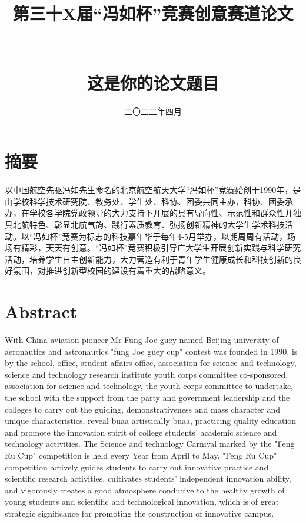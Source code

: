 \documentclass[lang=cn,12pt]{frbpaper}
\title{第三十X届“冯如杯”竞赛创意赛道论文\\ \quad \\ \quad \\这是你的论文题目}
\date{二〇二二年四月}
\begin{document}
\maketitle


\makeabstract

\section*{摘要}
以中国航空先驱冯如先生命名的北京航空航天大学“冯如杯”竞赛始创于1990年，是由学校科学技术研究院、教务处、学生处、科协、团委共同主办，科协、团委承办，在学校各学院党政领导的大力支持下开展的具有导向性、示范性和群众性并独具北航特色、彰显北航气韵、践行素质教育、弘扬创新精神的大学生学术科技活动。以“冯如杯”竞赛为标志的科技嘉年华于每年4-5月举办，以期周周有活动，场场有精彩，天天有创意。“冯如杯”竞赛积极引导广大学生开展创新实践与科学研究活动，培养学生自主创新能力，大力营造有利于青年学生健康成长和科技创新的良好氛围，对推进创新型校园的建设有着重大的战略意义。

\clearpage


\section*{Abstract}
With China aviation pioneer Mr Fung Joe guey named Beijing university of aeronautics and astronautics "fung Joe guey cup" contest was founded in 1990, is by the school, office, student affairs office, association for science and technology, science and technology research institute youth corps committee co-sponsored, association for science and technology, the youth corps committee to undertake, the school with the support from the party and government leadership and the colleges to carry out the guiding, demonstrativeness and mass character and unique characteristics, reveal buaa artistically buaa, practicing quality education and promote the innovation spirit of college students' academic science and technology activities. The Science and technology Carnival marked by the "Feng Ru Cup" competition is held every Year from April to May. "Feng Ru Cup" competition actively guides students to carry out innovative practice and scientific research activities, cultivates students' independent innovation ability, and vigorously creates a good atmosphere conducive to the healthy growth of young students and scientific and technological innovation, which is of great strategic significance for promoting the construction of innovative campus.
\end{document}
